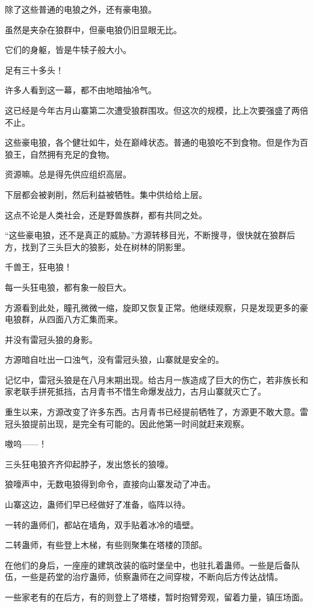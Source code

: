 \begin{this_body}
除了这些普通的电狼之外，还有豪电狼。

虽然是夹杂在狼群中，但豪电狼仍旧显眼无比。

它们的身躯，皆是牛犊子般大小。

足有三十多头！

许多人看到这一幕，都不由地暗抽冷气。

这已经是今年古月山寨第二次遭受狼群围攻。但这次的规模，比上次要强盛了两倍不止。

这些豪电狼，各个健壮如牛，处在巅峰状态。普通的电狼吃不到食物。但是作为百狼王，自然拥有充足的食物。

资源嘛。总是得先供应组织高层。

下层都会被剥削，然后利益被牺牲。集中供给给上层。

这点不论是人类社会，还是野兽族群，都有共同之处。

“这些豪电狼，还不是真正的威胁。”方源转移目光，不断搜寻，很快就在狼群后方，找到了三头巨大的狼影，处在树林的阴影里。

千兽王，狂电狼！

每一头狂电狼，都有象一般巨大。

方源看到此处，瞳孔微微一缩，旋即又恢复正常。他继续观察，只是发现更多的豪电狼群，从四面八方汇集而来。

并没有雷冠头狼的身影。

方源暗自吐出一口浊气，没有雷冠头狼，山寨就是安全的。

记忆中，雷冠头狼是在八月末期出现。给古月一族造成了巨大的伤亡，若非族长和家老联手拼死抵挡，古月青书不惜生命爆发战力，古月山寨就灭亡了。

重生以来，方源改变了许多东西。古月青书已经提前牺牲了，方源更不敢大意。雷冠头狼提前出现，是完全有可能的。因此他第一时间就赶来观察。

嗷呜——！

三头狂电狼齐齐仰起脖子，发出悠长的狼嚎。

狼嚎声中，无数电狼得到命令，直接向山寨发动了冲击。

山寨这边，蛊师们早已经做好了准备，临阵以待。

一转的蛊师们，都站在墙角，双手贴着冰冷的墙壁。

二转蛊师，有些登上木梯，有些则聚集在塔楼的顶部。

在他们的身后，一座座的建筑改装的临时堡垒中，也驻扎着蛊师。一些是后备队伍，一些是药堂的治疗蛊师，侦察蛊师在之间穿梭，不断向后方传达战情。

一些家老有的在后方，有的则登上了塔楼，暂时抱臂旁观，留着力量，镇压场面。


\end{this_body}

